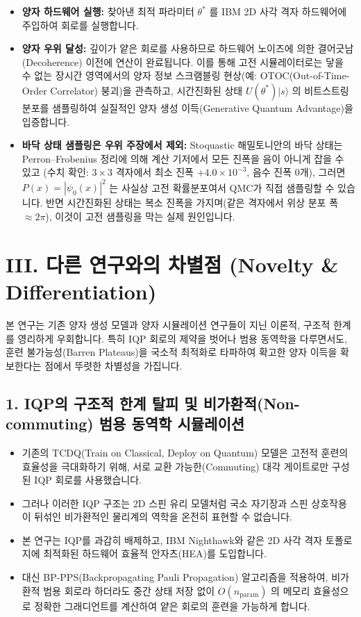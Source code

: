 \documentclass[11pt,a4paper]{article}
\begin{document}
\begin{itemize}
    \item \textbf{양자 하드웨어 실행:} 찾아낸 최적 파라미터 $\theta^*$ 를 IBM 2D 사각 격자 하드웨어에 주입하여 회로를 실행합니다.
    \item \textbf{양자 우위 달성:} 깊이가 얕은 회로를 사용하므로 하드웨어 노이즈에 의한 결어긋남(Decoherence) 이전에 연산이 완료됩니다. 이를 통해 고전 시뮬레이터로는 닿을 수 없는 장시간 영역에서의 양자 정보 스크램블링 현상(예: OTOC(Out-of-Time-Order Correlator) 붕괴)을 관측하고, 시간진화된 상태 $U(\theta^*)|s\rangle$ 의 비트스트링 분포를 샘플링하여 실질적인 양자 생성 이득(Generative Quantum Advantage)을 입증합니다.
    \item \textbf{바닥 상태 샘플링은 우위 주장에서 제외:} Stoquastic 해밀토니안의 바닥 상태는 Perron--Frobenius 정리에 의해 계산 기저에서 모든 진폭을 음이 아니게 잡을 수 있고 (수치 확인: $3\times3$ 격자에서 최소 진폭 $+4.0\times10^{-3}$, 음수 진폭 0개), 그러면 $P(x)=|\psi_0(x)|^2$ 는 사실상 고전 확률분포여서 QMC가 직접 샘플링할 수 있습니다. 반면 시간진화된 상태는 복소 진폭을 가지며(같은 격자에서 위상 분포 폭 $\approx 2\pi$), 이것이 고전 샘플링을 막는 실제 원인입니다.
\end{itemize}

\vspace{0.6em}
\section*{III. 다른 연구와의 차별점 (Novelty \& Differentiation)}

본 연구는 기존 양자 생성 모델과 양자 시뮬레이션 연구들이 지닌 이론적, 구조적 한계를 영리하게 우회합니다. 특히 IQP 회로의 제약을 벗어나 범용 동역학을 다루면서도, 훈련 불가능성(Barren Plateaus)을 국소적 최적화로 타파하여 확고한 양자 이득을 확보한다는 점에서 뚜렷한 차별성을 가집니다.

\subsection*{1. IQP의 구조적 한계 탈피 및 비가환적(Non-commuting) 범용 동역학 시뮬레이션}
\begin{itemize}
    \item 기존의 TCDQ(Train on Classical, Deploy on Quantum) 모델은 고전적 훈련의 효율성을 극대화하기 위해, 서로 교환 가능한(Commuting) 대각 게이트로만 구성된 IQP 회로를 사용했습니다.
    \item 그러나 이러한 IQP 구조는 2D 스핀 유리 모델처럼 국소 자기장과 스핀 상호작용이 뒤섞인 비가환적인 물리계의 역학을 온전히 표현할 수 없습니다.
    \item 본 연구는 IQP를 과감히 배제하고, IBM Nighthawk와 같은 2D 사각 격자 토폴로지에 최적화된 하드웨어 효율적 안자츠(HEA)를 도입합니다.
    \item 대신 BP-PPS(Backpropagating Pauli Propagation) 알고리즘을 적용하여, 비가환적 범용 회로라 하더라도 중간 상태 저장 없이 $O(n_{\mathrm{param}})$ 의 메모리 효율성으로 정확한 그래디언트를 계산하여 얕은 회로의 훈련을 가능하게 합니다.
\end{itemize}
\end{document}
